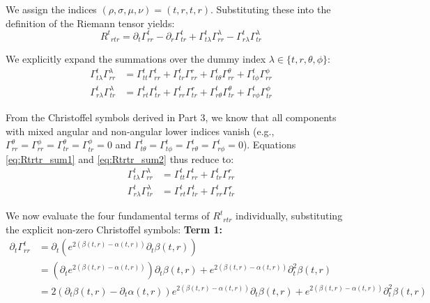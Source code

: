 \documentclass[11pt, a4paper]{report}
\begin{document}
We assign the indices $(\rho, \sigma, \mu, \nu) = (t, r, t, r)$. Substituting these into the definition of the Riemann tensor yields:
\begin{equation}
    {R^t}_{rtr} = \partial_t \Gamma^t_{rr} - \partial_r \Gamma^t_{tr} + \Gamma^t_{t\lambda}\Gamma^\lambda_{rr} - \Gamma^t_{r\lambda}\Gamma^\lambda_{tr}
\end{equation}

We explicitly expand the summations over the dummy index $\lambda \in \{t, r, \theta, \phi\}$:
\begin{align}
    \Gamma^t_{t\lambda}\Gamma^\lambda_{rr} &= \Gamma^t_{tt}\Gamma^t_{rr} + \Gamma^t_{tr}\Gamma^r_{rr} + \Gamma^t_{t\theta}\Gamma^\theta_{rr} + \Gamma^t_{t\phi}\Gamma^\phi_{rr} \label{eq:Rtrtr_sum1} \\
    \Gamma^t_{r\lambda}\Gamma^\lambda_{tr} &= \Gamma^t_{rt}\Gamma^t_{tr} + \Gamma^t_{rr}\Gamma^r_{tr} + \Gamma^t_{r\theta}\Gamma^\theta_{tr} + \Gamma^t_{r\phi}\Gamma^\phi_{tr} \label{eq:Rtrtr_sum2}
\end{align}

From the Christoffel symbols derived in Part 3, we know that all components with mixed angular and non-angular lower indices vanish (e.g., $\Gamma^\theta_{rr} = \Gamma^\phi_{rr} = \Gamma^\theta_{tr} = \Gamma^\phi_{tr} = 0$ and $\Gamma^t_{t\theta} = \Gamma^t_{t\phi} = \Gamma^t_{r\theta} = \Gamma^t_{r\phi} = 0$). Equations \eqref{eq:Rtrtr_sum1} and \eqref{eq:Rtrtr_sum2} thus reduce to:
\begin{align}
    \Gamma^t_{t\lambda}\Gamma^\lambda_{rr} &= \Gamma^t_{tt}\Gamma^t_{rr} + \Gamma^t_{tr}\Gamma^r_{rr} \\
    \Gamma^t_{r\lambda}\Gamma^\lambda_{tr} &= \Gamma^t_{rt}\Gamma^t_{tr} + \Gamma^t_{rr}\Gamma^r_{tr}
\end{align}

We now evaluate the four fundamental terms of ${R^t}_{rtr}$ individually, substituting the explicit non-zero Christoffel symbols:
\textbf{Term 1:}
\begin{align}
    \partial_t \Gamma^t_{rr} &= \partial_t \left( e^{2(\beta(t,r) - \alpha(t,r))} \partial_t \beta(t,r) \right) \nonumber \\
    &= \left( \partial_t e^{2(\beta(t,r) - \alpha(t,r))} \right) \partial_t \beta(t,r) + e^{2(\beta(t,r) - \alpha(t,r))} \partial_t^2 \beta(t,r) \nonumber \\
    &= 2(\partial_t \beta(t,r) - \partial_t \alpha(t,r)) e^{2(\beta(t,r) - \alpha(t,r))} \partial_t \beta(t,r) + e^{2(\beta(t,r) - \alpha(t,r))} \partial_t^2 \beta(t,r)
\end{align}
\end{document}
